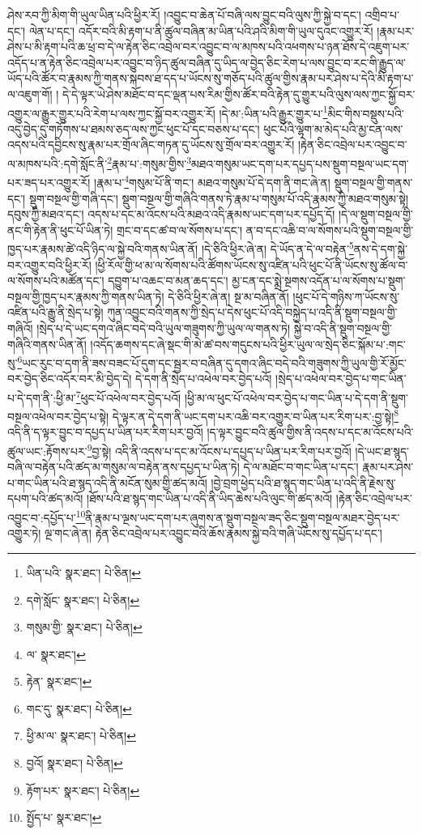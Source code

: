 ཤེས་རབ་ཀྱི་མིག་གི་ཡུལ་ཡིན་པའི་ཕྱིར་རོ། །འབྱུང་བ་ཆེན་པོ་བཞི་ལས་བྱུང་བའི་ལུས་ཀྱི་སྐྱེ་བ་དང་། འགྲིབ་པ་དང་། ལེན་པ་དང་། འདོར་བའི་མི་རྟག་པ་ནི་ཚུལ་བཞིན་མ་ཡིན་པའི་ཤའི་མིག་གི་ཡུལ་དུའང་འགྱུར་རོ། །རྣམ་པར་ཤེས་པ་མི་རྟག་པའི་ཆ་ཕྲ་བ་དེ་ལ་རྟེན་ཅིང་འབྲེལ་བར་འབྱུང་བ་ལ་མཁས་པའི་འཕགས་པ་ཉན་ཐོས་དེ་འཇུག་པར་འདོད་པ་ན་རྟེན་ཅིང་འབྲེལ་པར་འབྱུང་བ་ཉིད་ཚུལ་བཞིན་དུ་ཡིད་ལ་བྱེད་ཅིང་རེག་པ་ལས་བྱུང་བ་རང་གི་རྒྱུད་ལ་ཡོད་པའི་ཚོར་བ་རྣམས་ཀྱི་གནས་སྐབས་ཐ་དད་པ་ཡོངས་སུ་གཅོད་པའི་ཚུལ་གྱིས་རྣམ་པར་ཤེས་པ་དེའི་མི་རྟག་པ་ལ་འཇུག་གོ། །
དེ་དེ་ལྟར་ཡེ་ཤེས་མཐོང་བ་དང་ལྡན་པས་རིམ་གྱིས་ཚོར་བའི་རྟེན་དུ་གྱུར་པའི་ལུས་ལས་ཀྱང་སྐྱོ་བར་འགྱུར་ལ་རྒྱུར་གྱུར་པའི་རེག་པ་ལས་ཀྱང་སྐྱོ་བར་འགྱུར་རོ། །དེ་མ་:ཡིན་པའི་རྒྱུར་གྱུར་པ་\footnote{ཡིན་པའི་  སྣར་ཐང་།  པེ་ཅིན། }མིང་གིས་བསྡུས་པའི་འདུ་བྱེད་དུ་གཏོགས་པ་ཐམས་ཅད་ལས་ཀྱང་ཕུང་པོ་དང་བཅས་པ་དང་། ཕུང་པོའི་ལྷག་མ་མེད་པའི་མྱ་ངན་ལས་འདས་པའི་དབྱིངས་སུ་རྣམ་པར་གྲོལ་ཞིང་གཏན་དུ་ཡོངས་སུ་གྲོལ་བར་འགྱུར་རོ། །རྟེན་ཅིང་འབྲེལ་པར་འབྱུང་བ་ལ་མཁས་པའི་:དགེ་སློང་ནི་\footnote{དགེ་སློང་  སྣར་ཐང་།  པེ་ཅིན། }རྣམ་པ་:གསུམ་གྱིས་\footnote{གསུམ་གྱི་  སྣར་ཐང་།  པེ་ཅིན། }མཐའ་གསུམ་ཡང་དག་པར་དཔྱད་པས་སྡུག་བསྔལ་ཡང་དག་པར་ཟད་པར་འགྱུར་རོ། །རྣམ་པ་\footnote{ལ་  སྣར་ཐང་། }གསུམ་པོ་ནི་གང་། མཐའ་གསུམ་པོ་དེ་དག་ནི་གང་ཞེ་ན། སྡུག་བསྔལ་གྱི་གནས་དང་། སྡུག་བསྔལ་གྱི་གཞི་དང་། སྡུག་བསྔལ་གྱི་གཞིའི་གནས་ཏེ་རྣམ་པ་གསུམ་པོ་འདི་རྣམས་ཀྱི་མཐའ་གསུམ་སྟེ། དབུས་ཀྱི་མཐའ་དང་། འདས་པ་དང་མ་འོངས་པའི་མཐའ་འདི་རྣམས་ཡང་དག་པར་དཔྱོད་དོ། །དེ་ལ་སྡུག་བསྔལ་གྱི་ནང་གི་རྟེན་ནི་ཕུང་པོ་ཡིན་ཏེ། གྲང་བ་དང་ཚ་བ་ལ་སོགས་པ་དང་། ན་བ་དང་འཆི་བ་ལ་སོགས་པའི་སྡུག་བསྔལ་གྱི་ཁྱད་པར་རྣམས་ཚེ་འདི་ཉིད་ལ་སྐྱེ་བའི་གནས་ཡིན་ནོ། །དེ་ཅིའི་ཕྱིར་ཞེ་ན། དེ་ཡོད་ན་དེ་ལ་བརྟེན་\footnote{རྟེན་  སྣར་ཐང་། }ནས་དེ་དག་སྐྱེ་བར་འགྱུར་བའི་ཕྱིར་རོ། །ཕྱི་རོལ་གྱི་ཕ་མ་ལ་སོགས་པའི་ཚོགས་ཡོངས་སུ་འཛིན་པའི་ཕུང་པོ་ནི་ཡོངས་སུ་ཚོལ་བ་ལ་སོགས་པའི་མཚོན་དང་། དབྱུག་པ་འཆང་བ་མན་ཆད་དང་། མྱ་ངན་དང་སྨྲེ་སྔགས་འདོན་པ་ལ་སོགས་པ་སྡུག་བསྔལ་གྱི་ཁྱད་པར་རྣམས་ཀྱི་གནས་ཡིན་ཏེ། དེ་ཅིའི་ཕྱིར་ཞེ་ན། སྔ་མ་བཞིན་ནོ། །ཕུང་པོ་དེ་གཉིས་ཀ་ཡོངས་སུ་འཛིན་པའི་རྒྱུ་ནི་སྲེད་པ་སྟེ། ཀུན་འབྱུང་བའི་གནས་ཀྱི་སྲེད་པ་དེས་ཕུང་པོ་འདི་བསྐྱེད་པ་འདི་ནི་སྡུག་བསྔལ་གྱི་གཞིའོ། །སྲེད་པ་དེ་ཡང་དགའ་ཞིང་བདེ་བའི་ཡུལ་གཟུགས་ཀྱི་ཡུལ་ལ་གནས་ཏེ། སྐྱེ་བ་འདི་ནི་སྡུག་བསྔལ་གྱི་གཞིའི་གནས་ཡིན་ནོ། །འདོད་ཆགས་དང་ཞེ་སྡང་གི་མེ་ཚ་བས་གདུངས་པའི་ཕྱིར་ཡུལ་ལ་སྲེད་ཅིང་སྐོམ་པ་:གང་སུ་\footnote{གང་དུ་  སྣར་ཐང་།  པེ་ཅིན། }ཡང་རུང་བ་དག་ནི་ཟས་བཟང་པོ་དུག་དང་སྦྱར་བ་བཞིན་དུ་དགའ་ཞིང་བདེ་བའི་གཟུགས་ཀྱི་ཡུལ་གྱི་རོ་མྱོང་བར་བྱེད་ཅིང་འདོར་བར་མི་བྱེད་དེ། དེ་དག་ནི་སྲེད་པ་འཕེལ་བར་བྱེད་པའོ། །སྲེད་པ་འཕེལ་བར་བྱེད་པ་གང་ཡིན་པ་དེ་དག་ནི་:ཕྱི་མ་\footnote{ཕྱི་མ་ལ་  སྣར་ཐང་།  པེ་ཅིན། }ཕུང་པོ་འཕེལ་བར་བྱེད་པའོ། །ཕྱི་མ་ལ་ཕུང་པོ་འཕེལ་བར་བྱེད་པ་གང་ཡིན་པ་དེ་དག་ནི་སྡུག་བསྔལ་འཕེལ་བར་བྱེད་པ་སྟེ། དེ་ལྟར་ན་དེ་དག་ནི་ཡང་དག་པར་འཆི་བར་འགྱུར་བ་ཡིན་པར་རིག་པར་:བྱ་སྟེ།\footnote{བྱའོ།  སྣར་ཐང་།  པེ་ཅིན། } འདི་ནི་ད་ལྟར་བྱུང་བ་དཔྱད་པ་ཡིན་པར་རིག་པར་བྱའོ། །ད་ལྟར་བྱུང་བའི་ཚུལ་གྱིས་ནི་འདས་པ་དང་མ་འོངས་པའི་ཚུལ་ཡང་:རྟོགས་པར་\footnote{རྟོག་པར་  སྣར་ཐང་།  པེ་ཅིན། }བྱ་སྟེ། འདི་ནི་འདས་པ་དང་མ་འོངས་པ་དཔྱད་པ་ཡིན་པར་རིག་པར་བྱའོ། །དེ་ཡང་ཐ་སྙད་བཞི་ལ་བརྟེན་པའི་ཚད་མ་གསུམ་ལ་བརྟེན་ནས་དཔྱད་པ་ཡིན་ཏེ། དེ་ལ་མཐོང་བ་གང་ཡིན་པ་དང་། རྣམ་པར་ཤེས་པ་གང་ཡིན་པའི་ཐ་སྙད་འདི་ནི་མངོན་སུམ་གྱི་ཚད་མའོ། །བྱེ་བྲག་ཕྱེད་པའི་ཐ་སྙད་གང་ཡིན་པ་འདི་ནི་རྗེས་སུ་དཔག་པའི་ཚད་མའོ། །ཐོས་པའི་ཐ་སྙད་གང་ཡིན་པ་འདི་ནི་ཡིད་ཆེས་པའི་ལུང་གི་ཚད་མའོ། །རྟེན་ཅིང་འབྲེལ་པར་འབྱུང་བ་:དཔྱོད་པ་\footnote{སྤྱོད་པ་  སྣར་ཐང་། }ནི་རྣམ་པ་ལྔས་ཡང་དག་པར་ཞུགས་ན་སྡུག་བསྔལ་ཟད་ཅིང་སྡུག་བསྔལ་མཐར་བྱེད་པར་འགྱུར་ཏེ། ལྔ་གང་ཞེ་ན། རྟེན་ཅིང་འབྲེལ་པར་འབྱུང་བའི་ཆོས་རྣམས་སྐྱེ་བའི་གཞི་ཡོངས་སུ་དཔྱོད་པ་དང་། 